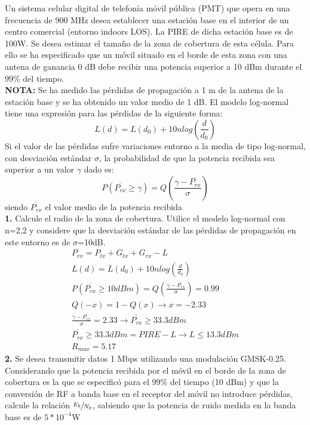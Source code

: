 \begin{exercise}[4]
	Un sistema celular digital de telefonía móvil pública (PMT) que opera en una frecuencia de 900 MHz desea establecer una estación base en el interior de un centro comercial (entorno indoors LOS). La PIRE de dicha estación base es de 100W. Se desea estimar el tamaño de la zona de cobertura de esta célula. Para ello se ha especificado que un móvil situado en el borde de esta zona con una antena de ganancia 0 dB debe recibir una potencia superior a 10 dBm durante el 99\% del tiempo.\\
	\textbf{NOTA:} Se ha medido las pérdidas de propagación a 1 m de la antena de la estación base y se ha obtenido un valor medio de 1 dB. El modelo log-normal tiene una expresión para las pérdidas de la siguiente forma:
	\[L(d)=L(d_0)+10nlog(\frac{d}{d_0})\]
	Si el valor de las pérdidas sufre variaciones entorno a la media de tipo log-normal, con desviación estándar $\sigma$, la probabilidad de que la potencia recibida sea superior a un valor $\gamma$ dado es: 
	\[P(\overline{P_{rx}}\geq \gamma)=Q(\frac{\gamma-\overline{P_{rx}}}{\sigma})\]
	siendo $\overline{P_{rx}}$ el valor medio de la potencia recibida\\
	\textbf{1.} Calcule el radio de la zona de cobertura. Utilice el modelo log-normal con n=2,2 y considere que la desviación estándar de las pérdidas de propagación en este entorno es de $\sigma$=10dB.\\
	\begin{gather*}
		P_{rx}=P_{tx}+G_{tx}+G_{rx}-L\\
		L(d)=L(d_0)+10nlog(\frac{d}{d_0})\\
		P(\overline{P_{rx}}\geq 10dBm)=Q(\frac{\gamma-\overline{P_{rx}}}{\sigma})=0.99\\
		Q(-x)=1-Q(x)\to x=-2.33\\
		\frac{\gamma-\overline{P_{rx}}}{\sigma}=2.33\to \overline{P_{rx}}\geq 33.3dBm\\
		\overline{P_{rx}}\geq 33.3dBm=PIRE-L\to L\leq 13.3dBm\\
		R_{max}=5.17
	\end{gather*}
	\textbf{2.} Se desea transmitir datos 1 Mbps utilizando una modulación GMSK-0.25. Considerando que la potencia recibida por el móvil en el borde de la zona de cobertura es la que se especificó para el 99\% del tiempo (10 dBm) y que la conversión de RF a banda base en el receptor del móvil no introduce pérdidas, calcule la relación $\sfrac{E_b}{N_0}$, sabiendo que la potencia de ruido medida en la banda base es de $5*10^{-4}$W\\

\end{exercise}
